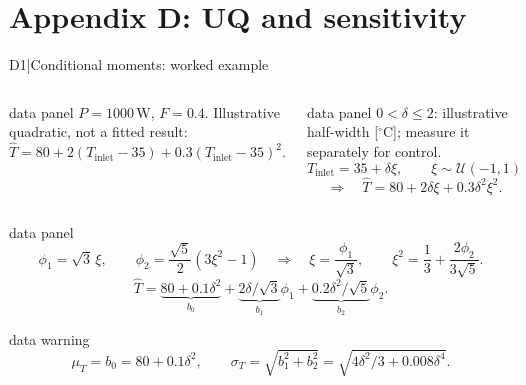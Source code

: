 

\section{Appendix D: UQ and sensitivity}

\renewcommand{\backupcode}{D1}

\begin{frame}[more-space,label=backup-D1]{D1\enspace|\enspace Conditional moments: worked example}
  \footnotesize
  \setlength{\abovedisplayskip}{2pt}
  \setlength{\belowdisplayskip}{2pt}
  \setlength{\abovedisplayshortskip}{1pt}
  \setlength{\belowdisplayshortskip}{1pt}
  \begin{columns}[T,onlytextwidth]
      \begin{beamercolorbox}[sep=1.5mm,wd=\linewidth]{data panel}
        $P=1000\,\mathrm W$, $F=0.4$. Illustrative quadratic, not a fitted result:
        \[
          \widehat T=80+2(T_{\mathrm{inlet}}-35)
            +0.3(T_{\mathrm{inlet}}-35)^2.
        \]
      \end{beamercolorbox}
      \begin{beamercolorbox}[sep=1.5mm,wd=\linewidth]{data panel}
        $0<\delta\leq2$: illustrative half-width [${}^\circ$C]; measure it separately for control.
        \[
          T_{\mathrm{inlet}}=35+\delta\xi,\qquad \xi\sim\mathcal U(-1,1)
        \]
        \[
          \Longrightarrow\quad\widehat T=80+2\delta\xi+0.3\delta^2\xi^2.
        \]
      \end{beamercolorbox}
  \end{columns}
  \smallskip
  \begin{beamercolorbox}[sep=1.5mm,wd=\textwidth]{data panel}
    \[
      \phi_1=\sqrt3\,\xi,\qquad
      \phi_2=\frac{\sqrt5}{2}(3\xi^2-1)
      \quad\Longrightarrow\quad
      \xi=\frac{\phi_1}{\sqrt3},\qquad
      \xi^2=\frac13+\frac{2\phi_2}{3\sqrt5}.
    \]
    \[
      \widehat T
        =\underbrace{80+0.1\delta^2}_{b_0}
             +\underbrace{2\delta/\sqrt3}_{b_1}\phi_1
             +\underbrace{0.2\delta^2/\sqrt5}_{b_2}\phi_2.
    \]
  \end{beamercolorbox}
  \smallskip
  \begin{beamercolorbox}[sep=1.5mm,wd=\textwidth]{data warning}
    \[
      \mu_T=b_0=80+0.1\delta^2,\qquad
      \sigma_T=\sqrt{b_1^2+b_2^2}
        =\sqrt{4\delta^2/3+0.008\delta^4}.
    \]
  \end{beamercolorbox}
\end{frame}

